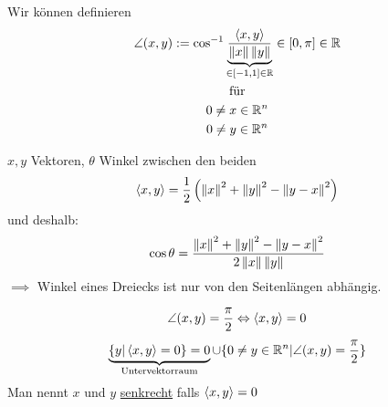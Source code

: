 \begin{Kor} Wir können definieren
\begin{gather*}
  \angle(x,y):=\cos^{-1}\underbrace{\frac{\left\langle x,y \right\rangle}{\left\| x \right\|\left\| y \right\|}}_{\in [-1,1]\in\mathbb{R}} \in [0,\pi]\in\mathbb{R}\\
  \text{für}\\
  0\neq x\in\mathbb{R}^n\\
  0\neq y\in\mathbb{R}^n
\end{gather*}
\end{Kor}
\begin{Kor}
$x,y$ Vektoren, $\theta$ Winkel zwischen den beiden
\[\left\langle x,y \right\rangle=\frac{1}{2}\left(\left\| x \right\|^2+\left\| y \right\|^2-\left\| y-x \right\|^2\right)\]
und deshalb:
\[\cos\theta=\frac{\left\| x \right\|^2+\left\| y \right\|^2-\left\| y-x \right\|^2}{2\left\| x \right\|\left\| y \right\|}\]
$\implies$ Winkel eines Dreiecks ist nur von den Seitenlängen abhängig.
\end{Kor}
\begin{Bsp}
\[\angle(x,y)=\frac{\pi}{2}\Leftrightarrow \left\langle x,y \right\rangle=0\]
\[\underbrace{\{y|\left\langle x,y \right\rangle=0\}={0}}_{\text{Untervektorraum}}\cup\{0\neq y\in\mathbb{R}^n|\angle(x,y)=\frac{\pi}{2}\}\]
Man nennt $x$ und $y$ \underline{senkrecht} falls $\left\langle x,y \right\rangle=0$
\end{Bsp}
